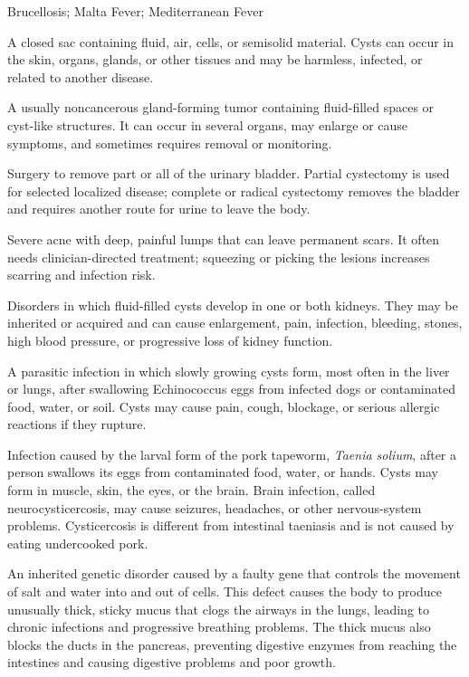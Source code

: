 \synonyms
Brucellosis; Malta Fever; Mediterranean Fever

 A closed sac containing fluid, air, cells, or semisolid material. Cysts can occur in the skin, organs, glands, or other tissues and may be harmless, infected, or related to another disease.

 A usually noncancerous gland-forming tumor containing fluid-filled spaces or cyst-like structures. It can occur in several organs, may enlarge or cause symptoms, and sometimes requires removal or monitoring.

 Surgery to remove part or all of the urinary bladder. Partial cystectomy is used for selected localized disease; complete or radical cystectomy removes the bladder and requires another route for urine to leave the body.

 Severe acne with deep, painful lumps that can leave permanent scars. It often needs clinician-directed treatment; squeezing or picking the lesions increases scarring and infection risk.

 Disorders in which fluid-filled cysts develop in one or both kidneys. They may be inherited or acquired and can cause enlargement, pain, infection, bleeding, stones, high blood pressure, or progressive loss of kidney function.

 A parasitic infection in which slowly growing cysts form, most often in the liver or lungs, after swallowing Echinococcus eggs from infected dogs or contaminated food, water, or soil. Cysts may cause pain, cough, blockage, or serious allergic reactions if they rupture.

 Infection caused by the larval form of the pork tapeworm, \textit{Taenia solium}, after a person swallows its eggs from contaminated food, water, or hands. Cysts may form in muscle, skin, the eyes, or the brain. Brain infection, called neurocysticercosis, may cause seizures, headaches, or other nervous-system problems. Cysticercosis is different from intestinal taeniasis and is not caused by eating undercooked pork.

 An inherited genetic disorder caused by a faulty gene that controls the movement of salt and water into and out of cells. This defect causes the body to produce unusually thick, sticky mucus that clogs the airways in the lungs, leading to chronic infections and progressive breathing problems. The thick mucus also blocks the ducts in the pancreas, preventing digestive enzymes from reaching the intestines and causing digestive problems and poor growth.


